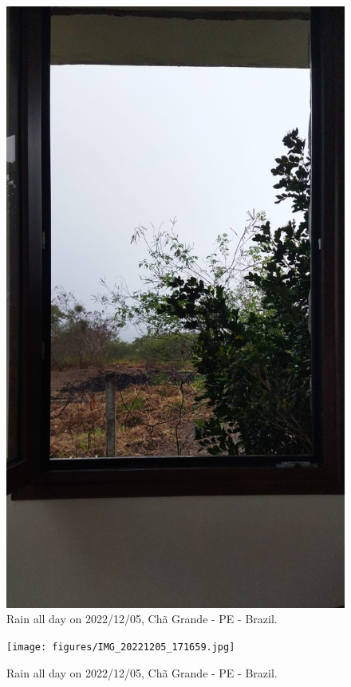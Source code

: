 \documentclass{book}
\begin{document}
\begin{figure}[h]
	\begin{center}
	    \caption{Rain all day on 2022/12/05, Chã Grande - PE - Brazil.}
		\label{fig:rain1}
		\centering
		\includegraphics[width=\textwidth]{figures/IMG-20221205-WA0005.jpg}
	\end{center}
\end{figure}

\begin{figure}[h]
	\begin{center}
	    \caption{Rain all day on 2022/12/05, Chã Grande - PE - Brazil.}
		\label{fig:rain2}
		\centering
		\texttt{[image: figures/IMG\_20221205\_171659.jpg]}
	\end{center}
\end{figure}
\end{document}
